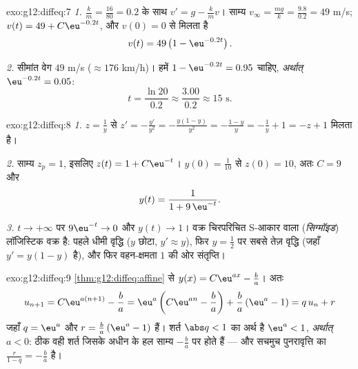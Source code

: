 \begin{solution}{exo:g12:diffeq:7}
\emph{1.} $\frac km = \frac{16}{80} = 0.2$ के साथ $v' = g - \frac{k}{m} v$। साम्य $v_\infty = \frac{mg}{k} = \frac{9.8}{0.2} = 49$ m/s; $v(t) = 49 + C\eu^{-0.2t}$, और $v(0) = 0$ से मिलता है
\[
v(t) = 49\left(1 - \eu^{-0.2 t}\right).
\]

\emph{2.} सीमांत वेग $49$ m/s ($\approx 176$ km/h)। हमें $1 - \eu^{-0.2t} = 0.95$ चाहिए, \emph{अर्थात्}
$\eu^{-0.2t} = 0.05$:
\[
t = \frac{\ln 20}{0.2} \approx \frac{3.00}{0.2} \approx 15 \text{ s}.
\]
\end{solution}

\begin{solution}{exo:g12:diffeq:8}
\emph{1.} $z = \frac1y$ से $z' = -\frac{y'}{y^2}
= -\frac{y(1-y)}{y^2} = -\frac{1-y}{y} = -\frac1y + 1 = -z + 1$ मिलता है।

\emph{2.} साम्य $z_p = 1$, इसलिए $z(t) = 1 + C\eu^{-t}$। $y(0) = \frac{1}{10}$ से $z(0) = 10$, अतः $C = 9$ और
\[
y(t) = \frac{1}{1 + 9\,\eu^{-t}} .
\]

\emph{3.} $t \to +\infty$ पर $9\eu^{-t} \to 0$ और $y(t) \to 1$। वक्र चिरपरिचित S-आकार वाला
(\emph{सिग्मॉइड}) लॉजिस्टिक वक्र है: पहले धीमी वृद्धि ($y$ छोटा, $y' \approx y$), फिर
$y = \frac12$ पर सबसे तेज़ वृद्धि (जहाँ $y' = y(1-y)$  है), और फिर वहन-क्षमता $1$ की ओर
संतृप्ति।
\end{solution}

\begin{solution}{exo:g12:diffeq:9}
\cref{thm:g12:diffeq:affine} से $y(x) = C\eu^{ax} - \frac ba$। अतः
\[
u_{n+1} = C\eu^{a(n+1)} - \frac ba
= \eu^{a}\left(C\eu^{an} - \frac ba\right) + \frac ba\left(\eu^a - 1\right)
= q\,u_n + r
\]
जहाँ $q = \eu^{a}$ और $r = \frac{b}{a}\left(\eu^{a} - 1\right)$ हैं। शर्त $\abs q < 1$ का अर्थ है $\eu^a < 1$, \emph{अर्थात्} $a < 0$: ठीक
वही शर्त जिसके अधीन  के हल साम्य $-\frac ba$ पर  होते हैं --- और
सचमुच पुनरावृत्ति का  $\frac{r}{1 - q} = -\frac{b}{a}$ है।
\end{solution}

